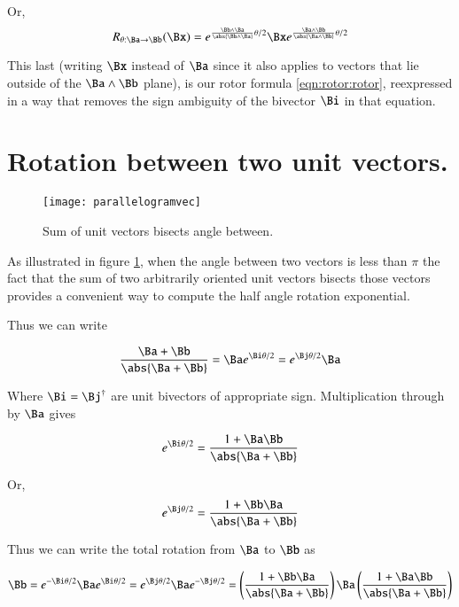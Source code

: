 Or,
\[
R_{\theta : \Ba \rightarrow \Bb}(\Bx)
= e^{ \frac{\Bb \wedge \Ba}{\abs{\Bb \wedge \Ba}} \theta/2 } \Bx e^{ \frac{\Ba \wedge \Bb}{\abs{\Ba \wedge \Bb}} \theta/2 }
\]

This last (writing $\Bx$ instead of $\Ba$ since it also applies to vectors that lie outside of the $\Ba \wedge \Bb$ plane), 
is our rotor formula \ref{eqn:rotor:rotor}, reexpressed in a way that removes the sign ambiguity of the bivector $\Bi$ in that equation.

\section{Rotation between two unit vectors. }

\begin{figure}[htp]
\centering
\texttt{[image: parallelogramvec]}
\caption{Sum of unit vectors bisects angle between.}\label{fig:parallelogramvec}
\end{figure}

As illustrated in figure \ref{fig:parallelogramvec}, when the angle between two vectors is less than $\pi$
the fact that the sum of two arbitrarily oriented unit vectors bisects those vectors provides a convenient 
way to compute the half angle rotation exponential.

Thus we can write

\begin{equation*}
\frac{\Ba + \Bb}{\abs{\Ba + \Bb}} = \Ba e^{\Bi\theta/2} = e^{\Bj\theta/2} \Ba
\end{equation*}

Where $\Bi = \Bj^\dagger$ are unit bivectors of appropriate sign.  Multiplication through by $\Ba$ gives

\begin{equation*}
e^{\Bi\theta/2} = 
\frac{1 + \Ba\Bb}{\abs{\Ba + \Bb}}
\end{equation*}

Or,
\begin{equation*}
e^{\Bj\theta/2} =
\frac{1 + \Bb\Ba}{\abs{\Ba + \Bb}}
\end{equation*}

Thus we can write the total rotation from $\Ba$ to $\Bb$ as

\begin{equation*}
\Bb 
= e^{-\Bi\theta/2} \Ba e^{\Bi\theta/2}
= e^{\Bj\theta/2} \Ba e^{-\Bj\theta/2}
= \left(\frac{1 + \Bb\Ba}{\abs{\Ba + \Bb}}\right) \Ba \left(\frac{1 + \Ba\Bb}{\abs{\Ba + \Bb}}\right)
\end{equation*}

